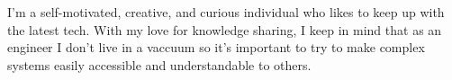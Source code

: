 \documentclass[10pt]{developercv} %
\begin{document}
\vspace{0.5cm}


\begin{minipage}[t]{0.45\textwidth} %
	\vspace{-\baselineskip} %

	I'm a self-motivated, creative, and curious individual who likes to keep up with the latest
	tech. With my love for knowledge sharing, I keep in mind that as an engineer I don't live in a vaccuum
	so it's important to try to make complex systems easily accessible and understandable to others. \\
\end{minipage}
\hfill  %
\begin{minipage}[t]{0.45\textwidth} %
	\vspace{-\baselineskip} %
	\begin{barchart}{5.5}
	\end{barchart}
\end{minipage}



\end{document}
